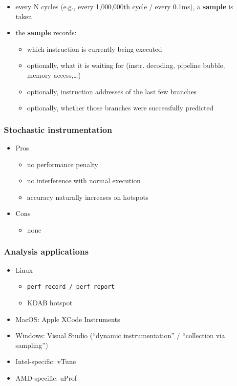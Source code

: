 \documentclass[12pt]{article}
\begin{document}
\begin{itemize}
    \item every N cycles (e.g., every 1,000,000th cycle / every 0.1ms), a \textbf{sample} is taken
    \item the \textbf{sample} records:
    \begin{itemize}
        \item which instruction is currently being executed
        \item optionally, what it is waiting for (instr. decoding, pipeline bubble, memory access,\ldots)
        \item optionally, instruction addresses of the last few branches
        \item optionally, whether those branches were successfully predicted
    \end{itemize}
\end{itemize}

\subsubsection{Stochastic instrumentation}
\begin{itemize}
    \item Pros
    \begin{itemize}
        \item no performance penalty
        \item no interference with normal execution
        \item accuracy naturally increases on hotspots
    \end{itemize}
    \item Cons
    \begin{itemize}
        \item none
    \end{itemize}
\end{itemize}

\subsubsection{Analysis applications}

\begin{itemize}
  \item Linux
  \begin{itemize}
    \item \texttt{perf record / perf report}
    \item KDAB hotspot
  \end{itemize}
  \item MacOS: Apple XCode Instruments
  \item Windows: Visual Studio (``dynamic instrumentation'' / ``collection via sampling'')
  \item Intel-specific: vTune
  \item AMD-specific: uProf
\end{itemize}
\end{document}
